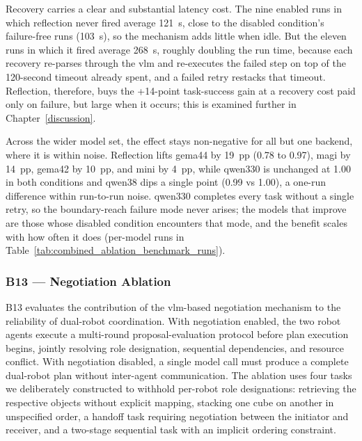 Recovery carries a clear and substantial latency cost. The nine enabled runs in which reflection never fired average 121~s, close to the disabled condition's failure-free runs (103~s), so the mechanism adds little when idle. But the eleven runs in which it fired average 268~s, roughly doubling the run time, because each recovery re-parses through the \gls{vlm} and re-executes the failed step on top of the 120-second timeout already spent, and a failed retry restacks that timeout. Reflection, therefore, buys the +14-point task-success gain at a recovery cost paid only on failure, but large when it occurs; this is examined further in Chapter~\ref{discussion}.

Across the wider model set, the effect stays non-negative for all but one backend, where it is within noise. Reflection lifts \gls{gema44} by 19~pp (0.78 to 0.97), \gls{magi} by 14~pp, \gls{gema42} by 10~pp, and \gls{mini} by 4~pp, while \gls{qwen330} is unchanged at 1.00 in both conditions and \gls{qwen38} dips a single point (0.99 vs 1.00), a one-run difference within run-to-run noise. \gls{qwen330} completes every task without a single retry, so the boundary-reach failure mode never arises; the models that improve are those whose disabled condition encounters that mode, and the benefit scales with how often it does (per-model runs in Table~\ref{tab:combined_ablation_benchmark_runs}).

\subsubsection{B13 — Negotiation Ablation}\label{sec:results-negotiation}
B13 evaluates the contribution of the \gls{vlm}-based negotiation mechanism to the reliability of dual-robot coordination. With negotiation enabled, the two robot agents execute a multi-round proposal-evaluation protocol before plan execution begins, jointly resolving role designation, sequential dependencies, and resource conflict. With negotiation disabled, a single model call must produce a complete dual-robot plan without inter-agent communication. The ablation uses four tasks we deliberately constructed to withhold per-robot role designations: retrieving the respective objects without explicit mapping, stacking one cube on another in unspecified order, a handoff task requiring negotiation between the initiator and receiver, and a two-stage sequential task with an implicit ordering constraint.

